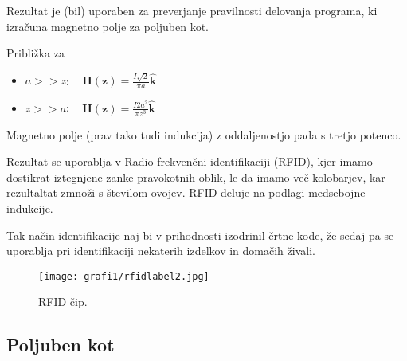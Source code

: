 \documentclass[12pt, a4paper]{article}
\begin{document}
Rezultat je (bil) uporaben za preverjanje pravilnosti delovanja programa, ki izračuna magnetno polje za poljuben kot. 

Približka za
\begin{itemize}
\item $a >> z$: $\;\;\; \mathbf{H(z)} = \frac{I\sqrt{2}}{\pi a} \mathbf{\hat{k}}$
\item $z >> a$: $\;\;\; \mathbf{H(z)} = \frac{I2a^2}{\pi z^3} \mathbf{\hat{k}}$
\end{itemize}

Magnetno polje (prav tako tudi indukcija) z oddaljenostjo pada s tretjo potenco.

Rezultat se uporablja v Radio-frekvenčni identifikaciji (RFID), kjer imamo dostikrat iztegnjene zanke pravokotnih oblik, le da imamo več kolobarjev, kar rezultaltat zmnoži s številom ovojev. RFID deluje na podlagi medsebojne indukcije. 

Tak način identifikacije naj bi v prihodnosti izodrinil črtne kode, že sedaj pa se uporablja pri identifikaciji nekaterih izdelkov in domačih živali.
\begin{figure}[h]
  \centering
  \texttt{[image: grafi1/rfidlabel2.jpg]}
  \caption{RFID čip.}
  \label{Slika}
\end{figure}


\subsection{Poljuben kot}
\end{document}
